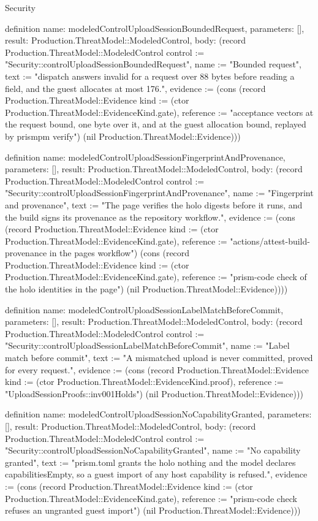 \begin{lexlean}{Security}
\begin{semanticmodule}
definition{
  name: modeledControlUploadSessionBoundedRequest,
  parameters: [],
  result: Production.ThreatModel::ModeledControl,
  body: (record Production.ThreatModel::ModeledControl {control := "Security::controlUploadSessionBoundedRequest", name := "Bounded request", text := "dispatch answers invalid for a request over 88 bytes before reading a field, and the guest allocates at most 176.", evidence := (cons (record Production.ThreatModel::Evidence {kind := (ctor Production.ThreatModel::EvidenceKind.gate), reference := "acceptance vectors at the request bound, one byte over it, and at the guest allocation bound, replayed by prismpm verify"}) (nil Production.ThreatModel::Evidence))})
}

definition{
  name: modeledControlUploadSessionFingerprintAndProvenance,
  parameters: [],
  result: Production.ThreatModel::ModeledControl,
  body: (record Production.ThreatModel::ModeledControl {control := "Security::controlUploadSessionFingerprintAndProvenance", name := "Fingerprint and provenance", text := "The page verifies the holo digests before it runs, and the build signs its provenance as the repository workflow.", evidence := (cons (record Production.ThreatModel::Evidence {kind := (ctor Production.ThreatModel::EvidenceKind.gate), reference := "actions/attest-build-provenance in the pages workflow"}) (cons (record Production.ThreatModel::Evidence {kind := (ctor Production.ThreatModel::EvidenceKind.gate), reference := "prism-code check of the holo identities in the page"}) (nil Production.ThreatModel::Evidence)))})
}

definition{
  name: modeledControlUploadSessionLabelMatchBeforeCommit,
  parameters: [],
  result: Production.ThreatModel::ModeledControl,
  body: (record Production.ThreatModel::ModeledControl {control := "Security::controlUploadSessionLabelMatchBeforeCommit", name := "Label match before commit", text := "A mismatched upload is never committed, proved for every request.", evidence := (cons (record Production.ThreatModel::Evidence {kind := (ctor Production.ThreatModel::EvidenceKind.proof), reference := "UploadSessionProofs::inv001Holds"}) (nil Production.ThreatModel::Evidence))})
}

definition{
  name: modeledControlUploadSessionNoCapabilityGranted,
  parameters: [],
  result: Production.ThreatModel::ModeledControl,
  body: (record Production.ThreatModel::ModeledControl {control := "Security::controlUploadSessionNoCapabilityGranted", name := "No capability granted", text := "prism.toml grants the holo nothing and the model declares capabilitiesEmpty, so a guest import of any host capability is refused.", evidence := (cons (record Production.ThreatModel::Evidence {kind := (ctor Production.ThreatModel::EvidenceKind.gate), reference := "prism-code check refuses an ungranted guest import"}) (nil Production.ThreatModel::Evidence))})
}


\end{semanticmodule}
\end{lexlean}
